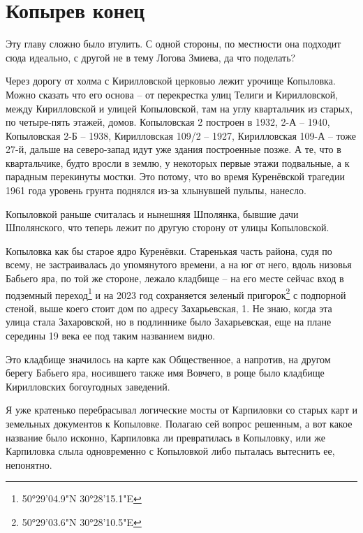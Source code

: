 \chapter{Копырев конец}

Эту главу сложно было втулить. С одной стороны, по местности она подходит сюда идеально, с другой не в тему Логова Змиева, да что поделать?

Через дорогу от холма с Кирилловской церковью лежит урочище Копыловка. Можно сказать что его основа – от перекрестка улиц Телиги и Кирилловской, между Кирилловской и улицей Копыловской, там на углу квартальчик из старых, по четыре-пять этажей, домов. Копыловская 2 построен в 1932, 2-А – 1940, Копыловская 2-Б – 1938, Кирилловская 109/2 – 1927, Кирилловская 109-А – тоже 27-й, дальше на северо-запад идут уже здания построенные позже. А те, что в квартальчике, будто вросли в землю, у некоторых первые этажи подвальные, а к парадным перекинуты мостки. Это потому, что во время Куренёвской трагедии 1961 года уровень грунта поднялся из-за хлынувшей пульпы, нанесло. 

Копыловкой раньше считалась и нынешняя Шполянка, бывшие дачи Шполянского, что теперь лежит по другую сторону от улицы Копыловской. 

Копыловка как бы старое ядро Куренёвки. Старенькая часть района, судя по всему, не застраивалась до упомянутого времени, а на юг от него, вдоль низовья Бабьего яра, по той же стороне, лежало кладбище – на его месте сейчас вход в подземный переход\footnote{50°29'04.9"N 30°28'15.1"E} и на 2023 год сохраняется зеленый пригорок\footnote{50°29'03.6"N 30°28'10.5"E} с подпорной стеной, выше коего стоит дом по адресу Захарьевская, 1. Не знаю, когда эта улица стала Захаровской, но в подлиннике было Захарьевская, еще на плане середины 19 века ее под таким названием видно.

Это кладбище значилось на карте как Общественное, а напротив, на другом берегу Бабьего яра, носившего также имя Вовчего, в роще было кладбище Кирилловских богоугодных заведений.

Я уже кратенько перебрасывал логические мосты от Карпиловки со старых карт и земельных документов к Копыловке. Полагаю сей вопрос решенным, а вот какое название было исконно, Карпиловка ли превратилась в Копыловку, или же Карпиловка слыла одновременно с Копыловкой либо пыталась вытеснить ее, непонятно. 


